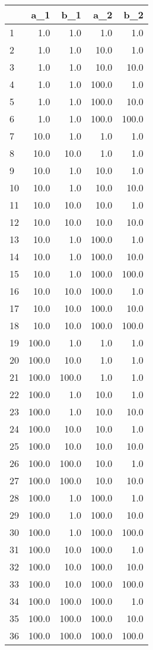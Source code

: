 \begin{tabular}{lrrrr}
\toprule
{} &    a\_1 &    b\_1 &    a\_2 &    b\_2 \\
\midrule
1  &    1.0 &    1.0 &    1.0 &    1.0 \\
2  &    1.0 &    1.0 &   10.0 &    1.0 \\
3  &    1.0 &    1.0 &   10.0 &   10.0 \\
4  &    1.0 &    1.0 &  100.0 &    1.0 \\
5  &    1.0 &    1.0 &  100.0 &   10.0 \\
6  &    1.0 &    1.0 &  100.0 &  100.0 \\
7  &   10.0 &    1.0 &    1.0 &    1.0 \\
8  &   10.0 &   10.0 &    1.0 &    1.0 \\
9  &   10.0 &    1.0 &   10.0 &    1.0 \\
10 &   10.0 &    1.0 &   10.0 &   10.0 \\
11 &   10.0 &   10.0 &   10.0 &    1.0 \\
12 &   10.0 &   10.0 &   10.0 &   10.0 \\
13 &   10.0 &    1.0 &  100.0 &    1.0 \\
14 &   10.0 &    1.0 &  100.0 &   10.0 \\
15 &   10.0 &    1.0 &  100.0 &  100.0 \\
16 &   10.0 &   10.0 &  100.0 &    1.0 \\
17 &   10.0 &   10.0 &  100.0 &   10.0 \\
18 &   10.0 &   10.0 &  100.0 &  100.0 \\
19 &  100.0 &    1.0 &    1.0 &    1.0 \\
20 &  100.0 &   10.0 &    1.0 &    1.0 \\
21 &  100.0 &  100.0 &    1.0 &    1.0 \\
22 &  100.0 &    1.0 &   10.0 &    1.0 \\
23 &  100.0 &    1.0 &   10.0 &   10.0 \\
24 &  100.0 &   10.0 &   10.0 &    1.0 \\
25 &  100.0 &   10.0 &   10.0 &   10.0 \\
26 &  100.0 &  100.0 &   10.0 &    1.0 \\
27 &  100.0 &  100.0 &   10.0 &   10.0 \\
28 &  100.0 &    1.0 &  100.0 &    1.0 \\
29 &  100.0 &    1.0 &  100.0 &   10.0 \\
30 &  100.0 &    1.0 &  100.0 &  100.0 \\
31 &  100.0 &   10.0 &  100.0 &    1.0 \\
32 &  100.0 &   10.0 &  100.0 &   10.0 \\
33 &  100.0 &   10.0 &  100.0 &  100.0 \\
34 &  100.0 &  100.0 &  100.0 &    1.0 \\
35 &  100.0 &  100.0 &  100.0 &   10.0 \\
36 &  100.0 &  100.0 &  100.0 &  100.0 \\
\bottomrule
\end{tabular}
